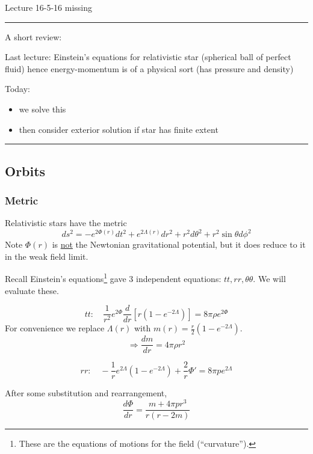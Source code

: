 \documentclass[a4paper]{article} %
\newcommand{\review}[1]
{
\hrule
A short review:

#1
\hrule
}
\begin{document}
\HRule

Lecture 16-5-16 missing

\HRule

\review{Last lecture: Einstein's equations for relativistic star (spherical ball of perfect fluid) hence energy-momentum is of a physical sort (has pressure and density)

Today: 
\begin{itemize}
\item we solve this
\item then consider exterior solution if star has finite extent
\end{itemize}
}

\subsection{Orbits}

\subsubsection{Metric}
Relativistic stars have the metric
\begin{equation}
ds^2=-e^{2\Phi(r)}dt^2 + e^{2\Lambda(r)}dr^2+r^2d\theta^2 + r^2\sin\theta d\phi^2
\end{equation}
Note $\Phi(r)$ is \underline{not} the Newtonian gravitational potential, but it does reduce to it in the weak field limit.

Recall Einstein's equations\footnote{These are the equations of motions for the field (``curvature'').} gave 3 independent equations: $tt,rr,\theta\theta$. We will evaluate these.

\begin{equation}
tt:\quad\frac{1}{r^2}e^{2\Phi}\frac{d}{dr}\left[r(1-e^{-2\Lambda})\right]=8\pi\rho e^{2\Phi}
\end{equation}
For convenience we replace $\Lambda(r)$ with $m(r)=\frac{r}{2}(1-e^{-2\Lambda})$.
\begin{equation}
\Rightarrow \frac{dm}{dr}=4\pi\rho r^2\label{unknowns1}
\end{equation}

\begin{equation}
rr:\quad -\frac{1}{r}e^{2\Lambda}(1-e^{-2\Lambda})+\frac{2}{r}\Phi'=8\pi p e^{2\Lambda}
\end{equation}

After some substitution and rearrangement,
\begin{equation}
\frac{d\Phi}{dr}=\frac{m+4\pi p r^3}{r(r-2m)}\label{unknowns2}
\end{equation}
\end{document}
